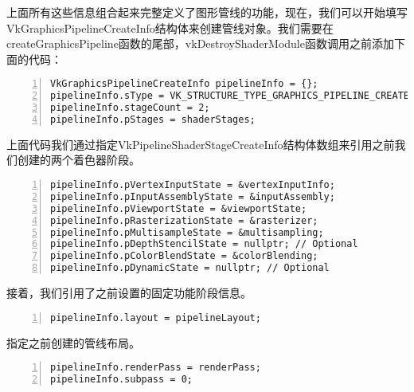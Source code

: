 \documentclass{ctexart}
\begin{document}
上面所有这些信息组合起来完整定义了图形管线的功能，现在，我们可以开始填写VkGraphicsPipelineCreateInfo结构体来创建管线对象。我们需要在createGraphicsPipeline函数的尾部，vkDestroyShaderModule函数调用之前添加下面的代码：

\begin{lstlisting}[language={[ANSI]C},keywordstyle=\color{blue!70},commentstyle=\color{red!50!green!50!blue!50},frame=shadowbox, rulesepcolor=\color{red!20!green!20!blue!20},basicstyle=\small,numbers=left, numberstyle=\tiny,breaklines=true]
VkGraphicsPipelineCreateInfo pipelineInfo = {};
pipelineInfo.sType = VK_STRUCTURE_TYPE_GRAPHICS_PIPELINE_CREATE_INFO;
pipelineInfo.stageCount = 2;
pipelineInfo.pStages = shaderStages;
\end{lstlisting}

上面代码我们通过指定VkPipelineShaderStageCreateInfo结构体数组来引用之前我们创建的两个着色器阶段。

\begin{lstlisting}[language={[ANSI]C},keywordstyle=\color{blue!70},commentstyle=\color{red!50!green!50!blue!50},frame=shadowbox, rulesepcolor=\color{red!20!green!20!blue!20},basicstyle=\small,numbers=left, numberstyle=\tiny,breaklines=true]
pipelineInfo.pVertexInputState = &vertexInputInfo;
pipelineInfo.pInputAssemblyState = &inputAssembly;
pipelineInfo.pViewportState = &viewportState;
pipelineInfo.pRasterizationState = &rasterizer;
pipelineInfo.pMultisampleState = &multisampling;
pipelineInfo.pDepthStencilState = nullptr; // Optional
pipelineInfo.pColorBlendState = &colorBlending;
pipelineInfo.pDynamicState = nullptr; // Optional
\end{lstlisting}

接着，我们引用了之前设置的固定功能阶段信息。

\begin{lstlisting}[language={[ANSI]C},keywordstyle=\color{blue!70},commentstyle=\color{red!50!green!50!blue!50},frame=shadowbox, rulesepcolor=\color{red!20!green!20!blue!20},basicstyle=\small,numbers=left, numberstyle=\tiny,breaklines=true]
pipelineInfo.layout = pipelineLayout;
\end{lstlisting}

指定之前创建的管线布局。

\begin{lstlisting}[language={[ANSI]C},keywordstyle=\color{blue!70},commentstyle=\color{red!50!green!50!blue!50},frame=shadowbox, rulesepcolor=\color{red!20!green!20!blue!20},basicstyle=\small,numbers=left, numberstyle=\tiny,breaklines=true]
pipelineInfo.renderPass = renderPass;
pipelineInfo.subpass = 0;
\end{lstlisting}
\end{document}
